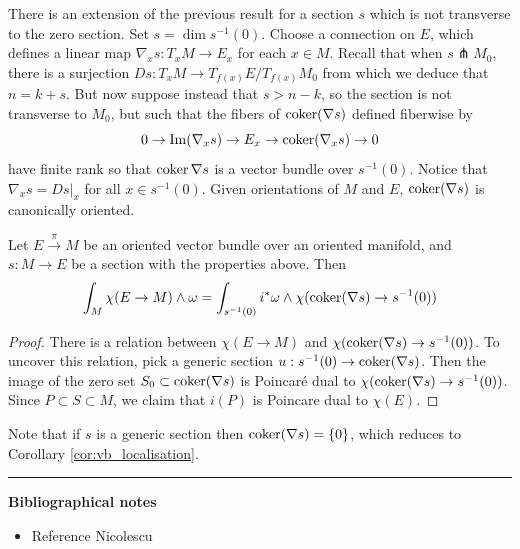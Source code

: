 There is an extension of the previous result for a section $s$ which is not
transverse to the zero section. Set $s= \dim s^{-1}(0)$. Choose a connection on
$E$, which defines a linear map $\nabla_x s : T_xM \to E_x$ for each  $x\in M$.
Recall that when $s \pitchfork M_0$, 
there is a surjection $Ds : T_x M \to T_{f(x)} E / T_{f(x)} M_0$ from which 
we deduce that $n = k + s$. 
But now suppose instead that  $s > n - k$, so
the section is not transverse to $M_0$, but such that the fibers of 
$\operatorname{coker} (\nabla s)$ defined fiberwise by 
\[
0 \to {\operatorname{Im}}(\nabla_x s) \to E_x \to \operatorname{coker} (\nabla_x s) \to 0
\] 
have finite rank so that $\operatorname{coker} \nabla s$ is a vector bundle over  $s^{-1}(0)$.
Notice that $\nabla_x s = Ds|_x$ for all  $x\in s^{-1}(0)$. 
Given orientations of  $M$ and  $E$, $\operatorname{coker}(\nabla s)$ is canonically oriented.


\begin{thm}
	Let $E \xrightarrow{\pi} M$ be an oriented vector bundle over an oriented
	manifold, and  $s : M \to E$ be a section with the properties above. 
	Then 
	\[
		\int_M \chi(E\to M)\wedge \omega 
		= \int_{s^{-1}(0)} i^*\omega \wedge \chi(\operatorname{coker}(\nabla s)\to s^{-1}(0))
\]
\end{thm}
\begin{proof} %
	There is a relation between $\chi(E\to M)$ and  
	$\chi(\operatorname{coker}(\nabla s)\to s^{-1}(0))$. To uncover this relation, pick
	a generic section $u : s^{-1}(0) \to \operatorname{coker}(\nabla s)$. Then the image of
	the zero set $S_0 \subset \operatorname{coker}(\nabla s)$ is Poincar\'e dual to 
	$\chi(\operatorname{coker}(\nabla s)\to s^{-1}(0))$. Since  $P\subset S \subset M$,
	we claim that $i(P)$ is Poincare dual to  $\chi(E)$.
\end{proof}

Note that if $s$ is a generic section then  $\operatorname{coker} (\nabla s) = \{0\}$, which
reduces to Corollary \ref{cor:vb_localisation}.


 

\vspace{5mm}
\hrule 
\vspace{5mm}

\textbf{Bibliographical notes}
{\small
\begin{itemize}
	\item Reference Nicolescu
\end{itemize}
}
